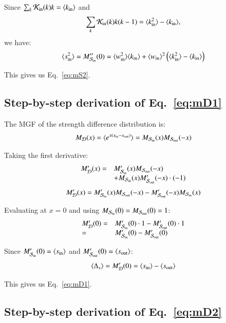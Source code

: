 \documentclass[a4paper,pre,superscriptaddress,floatfix,nofootinbib,twocolumn]{revtex4-1}
\begin{document}
Since $\sum_{k} {\cal K}_\text{in}(k) k = \langle k_{\text{in}} \rangle$ and
\[
\sum_{k} {\cal K}_\text{in}(k) k(k-1) = \langle k^2_{\text{in}} \rangle - \langle k_{\text{in}} \rangle,
\]
we have:
\[
\langle s^2_\text{in} \rangle = M''_{{\cal S}_\text{in}}(0) = \langle w^2_\text{in} \rangle \langle k_{\text{in}} \rangle + \langle w_\text{in} \rangle^2 \left( \langle k^2_{\text{in}} \rangle - \langle k_{\text{in}} \rangle \right)
\]

This gives us Eq.~\eqref{eq:mS2}.

\subsection*{Step-by-step derivation of Eq.~\eqref{eq:mD1}}

The MGF of the strength difference distribution is:
\[
M_{\cal D}(x) = \langle e^{x (s_\text{in} - s_\text{out})} \rangle = M_{{\cal S}_\text{in}}(x) M_{{\cal S}_\text{out}}(-x)
\]

Taking the first derivative:
\[
\begin{array}{ll}
M'_{\cal D}(x) = & M'_{{\cal S}_\text{in}}(x) M_{{\cal S}_\text{out}}(-x) \\
& + M_{{\cal S}_\text{in}}(x) M'_{{\cal S}_\text{out}}(-x) \cdot (-1)
\end{array}
\]
\[
M'_{\cal D}(x) = M'_{{\cal S}_\text{in}}(x) M_{{\cal S}_\text{out}}(-x) - M'_{{\cal S}_\text{out}}(-x) M_{{\cal S}_\text{in}}(x)
\]

Evaluating at $x = 0$ and using $M_{{\cal S}_\text{in}}(0) = M_{{\cal S}_\text{out}}(0) = 1$:
\[
\begin{array}{ll}
M'_{\cal D}(0) = & M'_{{\cal S}_\text{in}}(0) \cdot 1 - M'_{{\cal S}_\text{out}}(0) \cdot 1 \\
= & M'_{{\cal S}_\text{in}}(0) - M'_{{\cal S}_\text{out}}(0)
\end{array}
\]

Since $M'_{{\cal S}_\text{in}}(0) = \langle s_\text{in} \rangle$ and $M'_{{\cal S}_\text{out}}(0) = \langle s_\text{out} \rangle$:
\[
\langle \Delta_s \rangle = M'_{\cal D}(0) = \langle s_\text{in} \rangle - \langle s_\text{out} \rangle
\]

This gives us Eq.~\eqref{eq:mD1}.

\subsection*{Step-by-step derivation of Eq.~\eqref{eq:mD2}}
\end{document}
